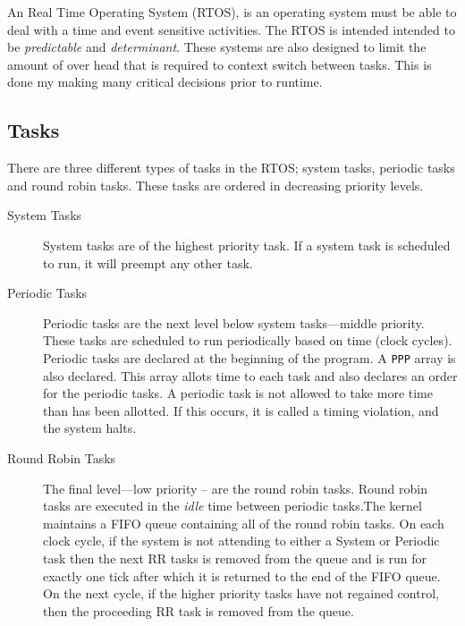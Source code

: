 

An Real Time Operating System (RTOS), is an operating system must be able to
deal with a time and event sensitive activities. The RTOS is intended intended
to be \textit{predictable} and \textit{determinant}\cite{RTOSMantis}. These
systems are also designed to limit the amount of over head that is required to
context switch between tasks. This is done my making many critical decisions
prior to runtime.



\subsection{Tasks}

There are three different types of tasks in the RTOS; system tasks, periodic tasks and round robin tasks. These tasks are ordered in decreasing priority levels.

\begin{description}
    \item[System Tasks]
    System tasks are of the highest priority task. If a system task is
    scheduled to run, it will preempt any other task.

    \item[Periodic Tasks]
    Periodic tasks are the next level below system tasks---middle priority.
    These tasks are scheduled to run periodically based on time (clock cycles).
    Periodic tasks are declared at the beginning of the program. A \texttt{PPP}
    array is also declared. This array allots time to each task and also
    declares an order for the periodic tasks. A periodic task is not allowed to
    take more time than has been allotted.  If this occurs, it is called a
    timing violation, and the system halts.

    \item[Round Robin Tasks]
    The final level---low priority -- are the round robin tasks. Round robin tasks
    are executed in the \textit{idle} time between periodic tasks.The kernel
    maintains a FIFO queue containing all of the round robin tasks. On each clock
    cycle, if the system is not attending to either a System or Periodic task then
    the next RR tasks is removed from the queue and is run for exactly one tick
    after which it is returned to the end of the FIFO queue. On the next cycle, if
    the higher priority tasks have not regained control, then the proceeding RR
    task is removed from the queue.  
\end{description}



